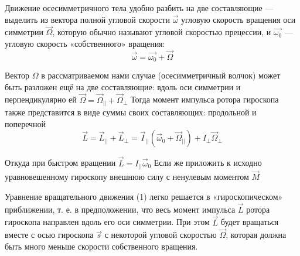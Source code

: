 \documentclass[12pt]{article}
\begin{document}
	Движение осесимметричного тела удобно разбить на две составляющие — выделить из вектора полной угловой скорости $\vec{\omega}$  угловую скорость вращения оси симметрии $\vec{\Omega}$, которую обычно называют угловой	скоростью прецессии, и $\vec{\omega_0}$ — угловую скорость «собственного» вращения:
	\begin{equation}
	\vec{\omega} = \vec{\omega_0} + \vec{\Omega}
	\end{equation}
	
	Вектор $\Omega$ в рассматриваемом нами случае (осесимметричный волчок) может быть разложен ещё на две составляющие: вдоль оси симметрии и перпендикулярно ей $\vec{\Omega} = \vec{\Omega}_{||}+\vec{\Omega}_{\perp}$	Тогда момент импульса ротора гироскопа также представится в виде суммы своих составляющих: продольной и поперечной
	\begin{equation}
	\vec{L} = \vec{L}_{||} + \vec{L}_{\perp} = \vec{I}_{||} \left( \vec{\omega}_0 + \vec{\Omega}_{||} \right) + I_{\perp} \vec{\Omega}_{\perp}
	\end{equation}
	
	Откуда при быстром вращении $\vec{L} = I_{||} \vec{\omega}_0$
	Если же приложить к исходно уравновешенному гироскопу внешнюю силу с ненулевым моментом $\vec{M}$
	
	Уравнение вращательного движения (1) легко решается в «гироскопическом» приближении, т. е. в предположении, что весь момент
	импульса $\vec{L}$ ротора гироскопа направлен вдоль его оси симметрии. При
	этом $\vec{L}$ будет вращаться вместе с осью гироскопа $\vec{s}$ с некоторой
	угловой скоростью $\vec{\Omega}$, которая должна быть много меньше скорости собственного вращения.
	
\end{document}
